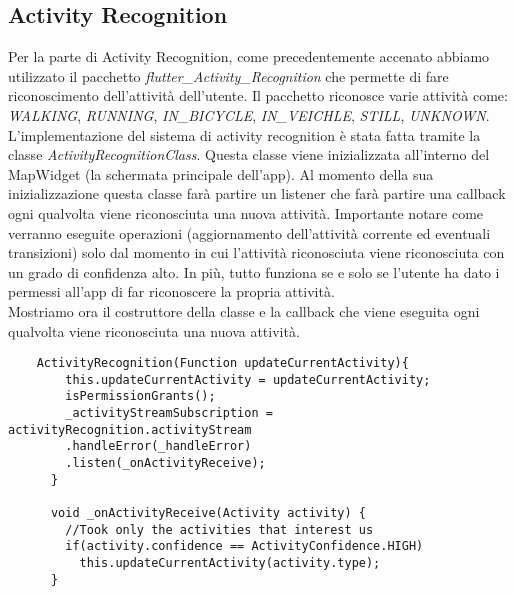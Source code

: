 \documentclass[../../Report.tex]{subfiles}
\begin{document}
\subsection{Activity Recognition}
Per la parte di Activity Recognition, come precedentemente accenato abbiamo utilizzato il pacchetto \emph{flutter\_Activity\_Recognition} che permette di fare riconoscimento dell'attività dell'utente. Il pacchetto riconosce varie attività come: \emph{WALKING}, \emph{RUNNING}, \emph{IN\_BICYCLE}, \emph{IN\_VEICHLE}, \emph{STILL}, \emph{UNKNOWN}. L'implementazione del sistema di activity recognition è stata fatta tramite la classe \emph{ActivityRecognitionClass}. Questa classe viene inizializzata all'interno del MapWidget (la schermata principale dell'app). Al momento della sua inizializzazione questa classe farà partire un listener che farà partire una callback ogni qualvolta viene riconosciuta una nuova attività. Importante notare come verranno eseguite operazioni (aggiornamento dell'attività corrente ed eventuali transizioni) solo dal momento in cui l'attività riconosciuta viene riconosciuta con un grado di confidenza alto. In più, tutto funziona se e solo se l'utente ha dato i permessi all'app di far riconoscere la propria attività.\\
Mostriamo ora il costruttore della classe e la callback che viene eseguita ogni qualvolta viene riconosciuta una nuova attività.\\
\begin{lstlisting}
    ActivityRecognition(Function updateCurrentActivity){
        this.updateCurrentActivity = updateCurrentActivity;
        isPermissionGrants();
        _activityStreamSubscription = activityRecognition.activityStream
        .handleError(_handleError)
        .listen(_onActivityReceive);
      }
    
      void _onActivityReceive(Activity activity) {
        //Took only the activities that interest us
        if(activity.confidence == ActivityConfidence.HIGH) 
          this.updateCurrentActivity(activity.type);
      }
\end{lstlisting}
\end{document}
